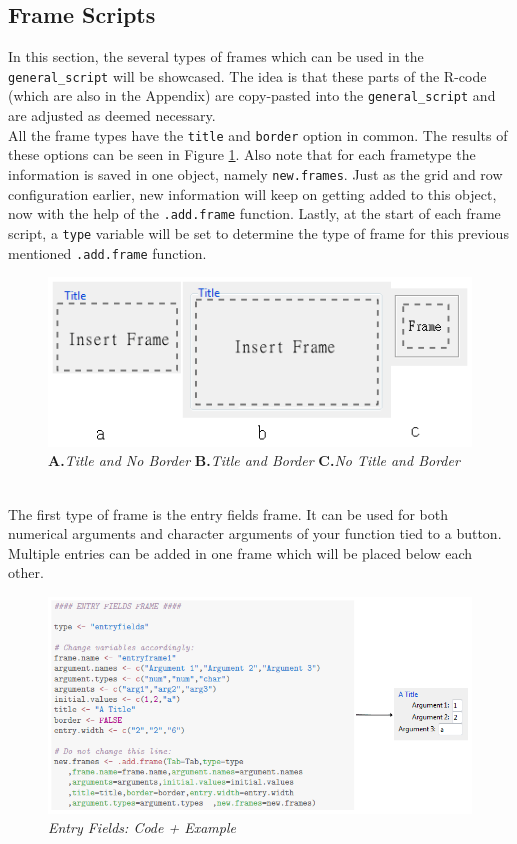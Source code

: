 \documentclass[a4paper]{article}\usepackage[]{graphicx}\usepackage[]{color}
\begin{document}
\subsection{Frame Scripts}
In this section, the several types of frames which can be used in the
\verb|general_script| will be showcased. The idea is that these parts of the
R-code (which are also in the Appendix) are copy-pasted into the
\verb|general_script| and are adjusted as deemed necessary. \\
All the frame types have the \verb|title| and
\verb|border| option in common. The results of these options can be seen in
Figure \ref{titleborder}. Also note that for each frametype the information is
saved in one object, namely \verb|new.frames|. Just as the grid and row configuration
earlier, new information will keep on getting added to this object, now with
the help of the \verb|.add.frame| function. Lastly, at the start of each frame
script, a \verb|type| variable will be set to determine the type of frame for
this previous mentioned \verb|.add.frame| function.

\begin{figure}[H]
\centering
\includegraphics[scale=0.8]{figures/title_border.png}
\caption{{\bf A.}{\it Title and No Border} {\bf B.}{\it Title and Border} {\bf
C.}{\it No Title and Border}
\label{titleborder}}
\end{figure}


\\
\noindent The first type of frame is the entry fields frame. It can be used for
both numerical arguments and character arguments of your function tied to a
button. Multiple entries can be added in one frame which will be placed below
each other.
\begin{figure}[H]
\centering
\includegraphics[scale=0.5]{figures/entryfields.png}
\caption{{\it Entry Fields: Code + Example}
\label{entryfields}}
\end{figure}
\end{document}
